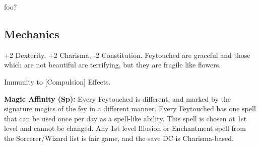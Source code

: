 
foo?

\subsection{Mechanics}

\begin{itemize*}
\item {}
\item {}
\item {}
\item {}
\item +2 Dexterity, +2 Charisma, -2 Constitution. Feytouched are graceful and those which are not beautiful are terrifying, but they are fragile like flowers.
\item Immunity to [Compulsion] Effects.
\item \textbf{Magic Affinity (Sp):} Every Feytouched is different, and marked by the signature magics of the fey in a different manner. Every Feytouched has one spell that can be used once per day as a spell-like ability. This spell is chosen at 1st level and cannot be changed. Any 1st level Illusion or Enchantment spell from the Sorcerer/Wizard list is fair game, and the save DC is Charisma-based.
\item {}
\item {}
\item {}
\end{itemize*}
